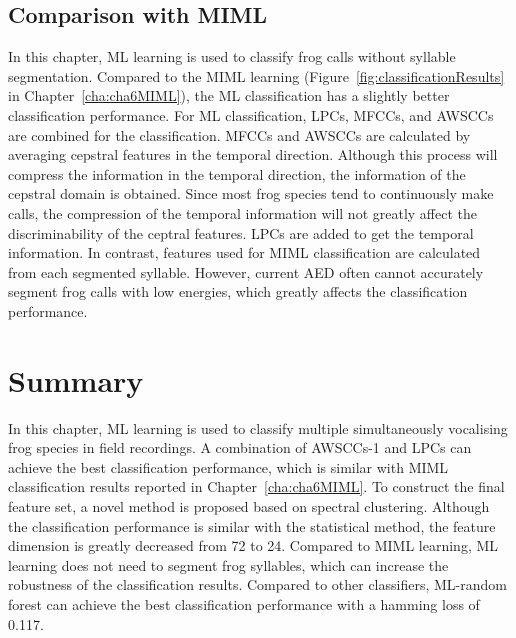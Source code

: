 \subsection{Comparison with MIML}
In this chapter, ML learning is used to classify frog calls without syllable segmentation. Compared to the MIML learning (Figure~\ref{fig:classificationResults} in Chapter~\ref{cha:cha6MIML}), the ML classification has a slightly better classification performance. For ML classification, LPCs, MFCCs, and AWSCCs are combined for the classification. MFCCs and AWSCCs are calculated by averaging cepstral features in the temporal direction. Although this process will compress the information in the temporal direction, the information of the cepstral domain is obtained. Since most frog species tend to continuously make calls, the compression of the temporal information will not greatly affect the discriminability of the ceptral features.
LPCs are added to get the temporal information. In contrast, features used for MIML classification are calculated from each segmented syllable. However, current AED often cannot accurately segment frog calls with low energies, which greatly affects the classification performance.


\section{Summary}
In this chapter, ML learning is used to classify multiple simultaneously vocalising frog species in field recordings. A combination of AWSCCs-1 and LPCs can achieve the best classification performance, which is similar with MIML classification results reported in Chapter~\ref{cha:cha6MIML}. To construct the final feature set, a novel method is proposed based on spectral clustering. Although the classification performance is similar with the statistical method, the feature dimension is greatly decreased from 72 to 24. Compared to MIML learning, ML learning does not need to segment frog syllables, which can increase the robustness of the classification results. Compared to other classifiers, ML-random forest can achieve the best classification performance with a hamming loss of 0.117. 





